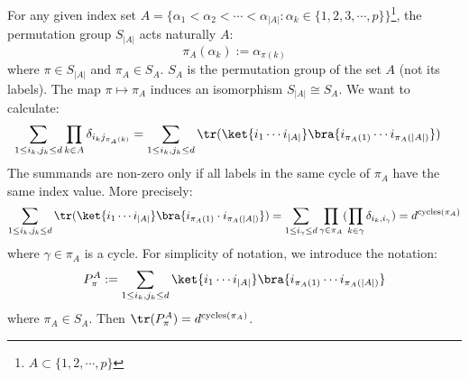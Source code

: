 \documentclass[a4paper,11pt]{article}
\theoremstyle{definition}
\numberwithin{equation}{section}
\begin{document}
\begin{enumerate}
    For any given index set $A = \{\alpha_1 < \alpha_2 < \cdots < \alpha_{|A|}: \alpha_k\in \{1,2,3,\cdots,p\}\}$\footnote{$A\subset \{1,2,\cdots,p\}$}, the permutation group $S_{|A|}$ acts naturally $A$:
    \begin{equation}
        \pi_A(\alpha_k):=\alpha_{\pi(k)}
    \end{equation}
    where $\pi\in S_{|A|}$ and $\pi_A\in S_A$. $S_A$ is the permutation group of the set $A$ (not its labels). The map $\pi\mapsto\pi_A$ induces an isomorphism $S_{|A|}\cong S_A$. We want to calculate:
    \begin{align}
        \begin{split}
            \sum_{1\leq i_k,j_k\leq d}\prod_{k\in A}\delta_{i_kj_{\pi_A(k)}} &= \sum_{1\leq i_k,j_k\leq d}\tr(\ket{i_1\cdots i_{|A|}}\bra{i_{\pi_A(1)}\cdots i_{\pi_A(|A|)}})
        \end{split}
    \end{align}
    The summands are non-zero only if all labels in the same cycle of $\pi_A$ have the same index value. More precisely:
    \begin{equation}
        \sum_{1\leq i_k,j_k\leq d}\tr(\ket{i_1\cdots i_{|A|}}\bra{i_{\pi_A(1)}\cdot i_{\pi_A(|A|)}}) = \sum_{1\leq i_\gamma\leq d}\prod_{\gamma\in\pi_A}(\prod_{k\in\gamma}\delta_{i_k,i_\gamma}) = d^{\text{cycles($\pi_A$)}}
    \end{equation}
    where $\gamma\in\pi_A$ is a cycle. For simplicity of notation, we introduce the notation:
    \begin{equation}
        P^A_\pi := \sum_{1\leq i_k,j_k\leq d}\ket{i_1\cdots i_{|A|}}\bra{i_{\pi_A(1)}\cdots i_{\pi_A(|A|)}}
    \end{equation}
    where $\pi_A\in S_{A}$. Then $\tr(P^A_\pi) = d^{\text{cycles($\pi_A$)}}$.
\end{enumerate}
\end{document}

